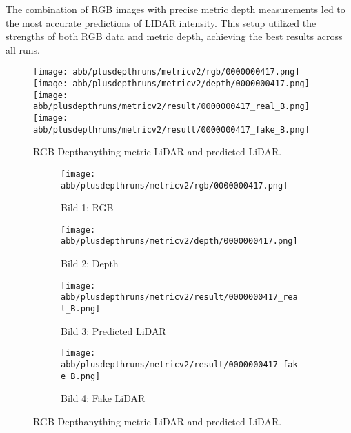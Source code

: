 The combination of RGB images with precise metric depth measurements led to the most accurate predictions of LIDAR intensity. This setup utilized the strengths of both RGB data and metric depth, achieving the best results across all runs.
\begin{figure}[!ht]
	\centering
	\texttt{[image: abb/plusdepthruns/metricv2/rgb/0000000417.png]}
	\texttt{[image: abb/plusdepthruns/metricv2/depth/0000000417.png]}
	\texttt{[image: abb/plusdepthruns/metricv2/result/0000000417\_real\_B.png]}
	\texttt{[image: abb/plusdepthruns/metricv2/result/0000000417\_fake\_B.png]}
	\caption{RGB Depthanything metric LiDAR and predicted LiDAR.}
	\label{bpplusv2}
	
\end{figure}
\begin{figure}[!ht]
	\centering
	
	\begin{subfigure}{0.8\textwidth}
		\centering
		\texttt{[image: abb/plusdepthruns/metricv2/rgb/0000000417.png]}
		\caption{Bild 1: RGB}
		\label{fig:bild1}
	\end{subfigure}
	
	\vspace{1em} %
	
	\begin{subfigure}{0.8\textwidth}
		\centering
		\texttt{[image: abb/plusdepthruns/metricv2/depth/0000000417.png]}
		\caption{Bild 2: Depth}
		\label{fig:bild2}
	\end{subfigure}
	
	\vspace{1em} %
	
	\begin{subfigure}{0.45\textwidth}
		\centering
		\texttt{[image: abb/plusdepthruns/metricv2/result/0000000417\_real\_B.png]}
		\caption{Bild 3: Predicted LiDAR}
		\label{fig:bild3}
	\end{subfigure}
	\hfill
	\begin{subfigure}{0.45\textwidth}
		\centering
		\texttt{[image: abb/plusdepthruns/metricv2/result/0000000417\_fake\_B.png]}
		\caption{Bild 4: Fake LiDAR}
		\label{fig:bild4}
	\end{subfigure}
	
	\caption{RGB Depthanything metric LiDAR and predicted LiDAR.}
	\label{bpplusv2}
\end{figure}
